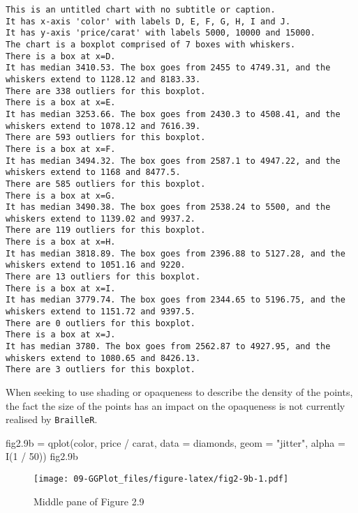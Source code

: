 \documentclass[
]{book}
\newenvironment{Shaded}{\begin{snugshade}}{\end{snugshade}}
\newcommand{\AttributeTok}[1]{\textcolor[rgb]{0.77,0.63,0.00}{#1}}
\newcommand{\DecValTok}[1]{\textcolor[rgb]{0.00,0.00,0.81}{#1}}
\newcommand{\FloatTok}[1]{\textcolor[rgb]{0.00,0.00,0.81}{#1}}
\newcommand{\FunctionTok}[1]{\textcolor[rgb]{0.00,0.00,0.00}{#1}}
\newcommand{\NormalTok}[1]{#1}
\newcommand{\OtherTok}[1]{\textcolor[rgb]{0.56,0.35,0.01}{#1}}
\newcommand{\SpecialCharTok}[1]{\textcolor[rgb]{0.00,0.00,0.00}{#1}}
\newcommand{\StringTok}[1]{\textcolor[rgb]{0.31,0.60,0.02}{#1}}
\begin{document}
\begin{verbatim}
This is an untitled chart with no subtitle or caption.
It has x-axis 'color' with labels D, E, F, G, H, I and J.
It has y-axis 'price/carat' with labels 5000, 10000 and 15000.
The chart is a boxplot comprised of 7 boxes with whiskers.
There is a box at x=D.
It has median 3410.53. The box goes from 2455 to 4749.31, and the whiskers extend to 1128.12 and 8183.33.
There are 338 outliers for this boxplot.
There is a box at x=E.
It has median 3253.66. The box goes from 2430.3 to 4508.41, and the whiskers extend to 1078.12 and 7616.39.
There are 593 outliers for this boxplot.
There is a box at x=F.
It has median 3494.32. The box goes from 2587.1 to 4947.22, and the whiskers extend to 1168 and 8477.5.
There are 585 outliers for this boxplot.
There is a box at x=G.
It has median 3490.38. The box goes from 2538.24 to 5500, and the whiskers extend to 1139.02 and 9937.2.
There are 119 outliers for this boxplot.
There is a box at x=H.
It has median 3818.89. The box goes from 2396.88 to 5127.28, and the whiskers extend to 1051.16 and 9220.
There are 13 outliers for this boxplot.
There is a box at x=I.
It has median 3779.74. The box goes from 2344.65 to 5196.75, and the whiskers extend to 1151.72 and 9397.5.
There are 0 outliers for this boxplot.
There is a box at x=J.
It has median 3780. The box goes from 2562.87 to 4927.95, and the whiskers extend to 1080.65 and 8426.13.
There are 3 outliers for this boxplot.
\end{verbatim}

When seeking to use shading or opaqueness to describe the density of the points, the fact the size of the points has an impact on the opaqueness is not currently realised by \texttt{BrailleR}.

\begin{Shaded}
\begin{Highlighting}[]
\NormalTok{fig2}\FloatTok{.9}\NormalTok{b }\OtherTok{=} \FunctionTok{qplot}\NormalTok{(color, price }\SpecialCharTok{/}\NormalTok{ carat, }\AttributeTok{data =}\NormalTok{ diamonds, }\AttributeTok{geom =} \StringTok{"jitter"}\NormalTok{, }\AttributeTok{alpha =} \FunctionTok{I}\NormalTok{(}\DecValTok{1} \SpecialCharTok{/} \DecValTok{50}\NormalTok{))    }
\NormalTok{fig2}\FloatTok{.9}\NormalTok{b}
\end{Highlighting}
\end{Shaded}

\begin{figure}
\centering
\texttt{[image: 09-GGPlot\_files/figure-latex/fig2-9b-1.pdf]}
\caption{\label{fig:fig2-9b}Middle pane of Figure 2.9}
\end{figure}
\end{document}
